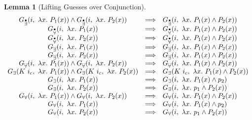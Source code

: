 \documentclass[a4paper,12pt,DIV=12,oneside]{scrbook}
\newtheorem{lemma}{Lemma}[section]
\theoremstyle{definition}
\theoremstyle{remark}
\newcommand{\GE}{\ensuremath{G_\exists}}
\newcommand{\GEP}{\ensuremath{G_{\accentset{\bullet}{\exists}}}}
\newcommand{\GEG}{\ensuremath{G_{\accentset{\_\,\_}{\exists}}}}
\newcommand{\GU}{\ensuremath{G_\forall}}
\newcommand{\GUP}{\ensuremath{G_{\accentset{\bullet}{\forall}}}}
\newcommand{\GUG}{\ensuremath{G_{\accentset{\_\,\_}{\forall}}}}
\begin{document}
\begin{lemma}[Lifting Guesses over Conjunction]\label{lemma_guesses_lift_conj}
\[
\begin{array}{c@{\quad}c@{\quad}l}
\GEP(i,\ \lambda x.\ P_1(x)) \wedge \GEP(i,\ \lambda x.\ P_2(x)) & \Longrightarrow & \GEP(i,\ \lambda x.\ P_1(x) \wedge P_2(x)) \\
\GUP(i,\ \lambda x.\ P_1(x)) & \Longrightarrow & \GUP(i,\ \lambda x.\ P_1(x) \wedge P_2(x)) \\
\GUP(i,\ \lambda x.\ P_2(x)) & \Longrightarrow & \GUP(i,\ \lambda x.\ P_1(x) \wedge P_2(x)) \\
\GEG(i,\ \lambda x.\ P_1(x)) & \Longrightarrow & \GEG(i,\ \lambda x.\ P_1(x) \wedge P_2(x)) \\
\GEG(i,\ \lambda x.\ P_2(x)) & \Longrightarrow & \GEG(i,\ \lambda x.\ P_1(x) \wedge P_2(x)) \\
\GUG(i,\ \lambda x.\ P_1(x)) \wedge \GUG(i,\ \lambda x.\ P_2(x)) & \Longrightarrow & \GUG(i,\ \lambda x.\ P_1(x) \wedge P_2(x)) \\

\GE(K\ i_c,\ \lambda x.\ P_1(x)) \wedge \GE(K\ i_c,\ \lambda x.\ P_2(x)) & \Longrightarrow & \GE(K\ i_c,\ \lambda x.\ P_1(x) \wedge P_2(x)) \\
\GE(i,\ \lambda x.\ P_1(x)) & \Longrightarrow & \GE(i,\ \lambda x.\ P_1(x) \wedge p_2) \\
\GE(i,\ \lambda x.\ P_2(x)) & \Longrightarrow & \GE(i,\ \lambda x.\ p_1 \wedge P_2(x)) \\

\GU(i,\ \lambda x.\ P_1(x)) \wedge \GU(i,\ \lambda x.\ P_2(x)) & \Longrightarrow & \GU(i,\ \lambda x.\ P_1(x) \wedge P_2(x)) \\
\GU(i,\ \lambda x.\ P_1(x)) & \Longrightarrow & \GU(i,\ \lambda x.\ P_1(x) \wedge p_2) \\
\GU(i,\ \lambda x.\ P_2(x)) & \Longrightarrow & \GU(i,\ \lambda x.\ p_1 \wedge P_2(x))
\end{array}
\]
\end{lemma}
\end{document}
